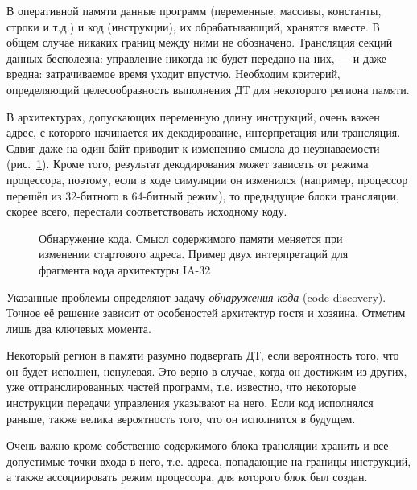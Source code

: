 \begin{itemize*}
    \item В оперативной памяти данные программ (переменные, массивы, константы, строки и т.д.) и код (инструкции), их обрабатывающий, хранятся вместе. В общем случае никаких границ между ними не обозначено. Трансляция секций данных бесполезна: управление никогда не будет передано на них, — и даже вредна: затрачиваемое время уходит впустую. Необходим критерий, определяющий целесообразность выполнения ДТ для некоторого региона памяти.
    
    \item В архитектурах, допускающих переменную длину инструкций, очень важен адрес, с которого начинается их декодирование, интерпретация или трансляция. Сдвиг даже на один байт приводит к изменению смысла до неузнаваемости (рис.~\ref{fig:byte-shift}). Кроме того, результат декодирования может зависеть от режима процессора, поэтому, если в ходе симуляции он изменился (например, процессор перешёл из 32-битного в 64-битный режим), то предыдущие блоки трансляции, скорее всего, перестали соответствовать исходному коду.
\end{itemize*}

\begin{figure}[htb]
    \centering
    \caption[Обнаружение кода]{Обнаружение кода. Смысл содержимого памяти меняется при изменении стартового адреса. Пример двух интерпретаций для фрагмента кода архитектуры IA-32}
    \label{fig:byte-shift}
\end{figure}

Указанные проблемы определяют задачу \textit{обнаружения кода} (\abbr code discovery). Точное её решение зависит от особеностей архитектур гостя и хозяина. Отметим лишь два ключевых момента.

\begin{itemize*}
    \item Некоторый регион в памяти разумно подвергать ДТ, если вероятность того, что он будет исполнен, ненулевая. Это верно в случае, когда он достижим из других, уже оттранслированных частей программ, т.е. известно, что некоторые инструкции передачи управления указывают на него. Если код исполнялся раньше, также велика вероятность того, что он исполнится в будущем.
    \item Очень важно кроме собственно содержимого блока трансляции хранить и все допустимые точки входа в него, т.е. адреса, попадающие на границы инструкций, а также ассоциировать режим процессора, для которого блок был создан.
\end{itemize*}

